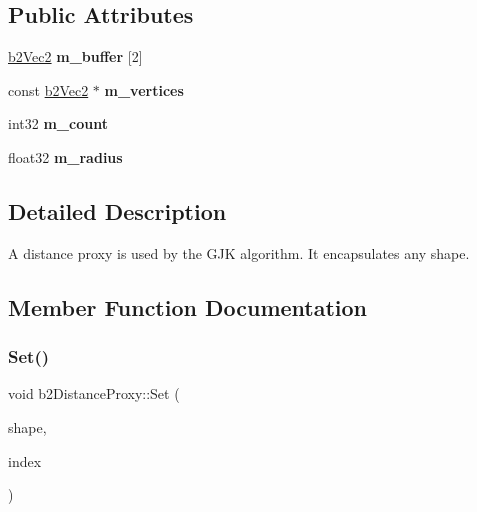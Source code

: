 \subsection*{Public Attributes}
\begin{DoxyCompactItemize}
\item 
\mbox{\label{structb2DistanceProxy_a92ec504d157b0e51003ab49715a2ae3d}} 
\hyperlink{structb2Vec2}{b2\+Vec2} {\bfseries m\+\_\+buffer} \mbox{[}2\mbox{]}
\item 
\mbox{\label{structb2DistanceProxy_ace977e0c15f67541f0fefdeae627c284}} 
const \hyperlink{structb2Vec2}{b2\+Vec2} $\ast$ {\bfseries m\+\_\+vertices}
\item 
\mbox{\label{structb2DistanceProxy_ae36efab1361bb1f94e32f9b956c6f1b3}} 
int32 {\bfseries m\+\_\+count}
\item 
\mbox{\label{structb2DistanceProxy_a459c93f35b1e62d583bd73d8c478ce89}} 
float32 {\bfseries m\+\_\+radius}
\end{DoxyCompactItemize}


\subsection{Detailed Description}
A distance proxy is used by the G\+JK algorithm. It encapsulates any shape. 

\subsection{Member Function Documentation}
\mbox{\label{structb2DistanceProxy_a80a59a9c9e952482a8fc6db4b883365d}} 
\subsubsection{\texorpdfstring{Set()}{Set()}\hspace{0.1cm}{\footnotesize\ttfamily [1/2]}}
{\footnotesize\ttfamily void b2\+Distance\+Proxy\+::\+Set (\begin{DoxyParamCaption}\item[{const \hyperlink{classb2Shape}{b2\+Shape} $\ast$}]{shape,  }\item[{int32}]{index }\end{DoxyParamCaption})}

